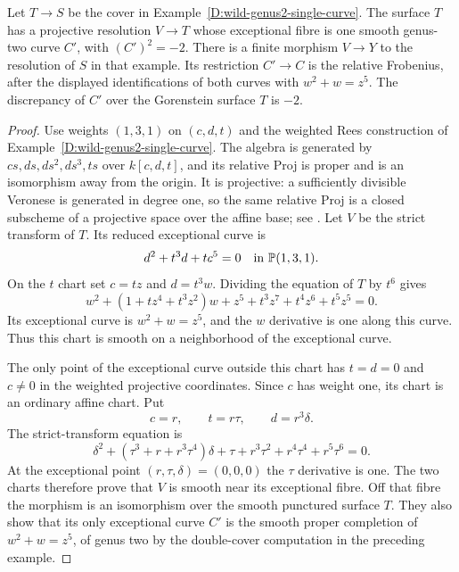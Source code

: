 \begin{proposition}
\label{D:wild-genus2-source}
Let $T\to S$ be the cover in Example~\ref{D:wild-genus2-single-curve}.
The surface $T$ has a projective resolution $V\to T$ whose
exceptional fibre is one smooth genus-two curve $C'$, with
$(C')^2=-2$.  There is a finite morphism $V\to Y$ to the
resolution of $S$ in that example.  Its restriction $C'\to C$
is the relative Frobenius, after the displayed identifications
of both curves with $w^2+w=z^5$.  The discrepancy of $C'$
over the Gorenstein surface $T$ is $-2$.
\end{proposition}
\begin{proof}
Use weights $(1,3,1)$ on $(c,d,t)$ and the weighted Rees
construction of Example~\ref{D:wild-genus2-single-curve}.
The algebra is generated by $cs,ds,ds^2,ds^3,ts$ over
$k[c,d,t]$, and its relative Proj is proper and is an
isomorphism away from the origin.  It is projective: a
sufficiently divisible Veronese is generated in degree one,
so the same relative Proj is a closed subscheme of a
projective space over the affine base; see
\cite[Lemma 10.56.2, tag 0EGH]{StacksBWildSource}.
Let $V$ be the strict
transform of $T$.  Its reduced exceptional curve is
\[
                 d^2+t^3d+tc^5=0
                       \quad\hbox{in }\mathbb P(1,3,1).
\]
On the $t$ chart set $c=tz$ and $d=t^3w$.  Dividing the
equation of $T$ by $t^6$ gives
\begin{equation}\label{D:source-t-chart}
 w^2+(1+tz^4+t^3z^2)w+
            z^5+t^3z^7+t^4z^6+t^5z^5=0.
\end{equation}
Its exceptional curve is $w^2+w=z^5$, and the $w$
derivative is one along this curve.  Thus this chart is
smooth on a neighborhood of the exceptional curve.

The only point of the exceptional curve outside this chart
has $t=d=0$ and $c\ne0$ in the weighted projective coordinates.
Since $c$ has weight one, its chart is an ordinary affine
chart.  Put
\[
                   c=r,\qquad t=r\tau,\qquad d=r^3\delta.
\]
The strict-transform equation is
\begin{equation}\label{D:source-c-chart}
 \delta^2+(\tau^3+r+r^3\tau^4)\delta
       +\tau+r^3\tau^2+r^4\tau^4+r^5\tau^6=0.
\end{equation}
At the exceptional point $(r,\tau,\delta)=(0,0,0)$ the
$\tau$ derivative is one.  The two charts therefore prove
that $V$ is smooth near its exceptional fibre.  Off that
fibre the morphism is an isomorphism over the smooth
punctured surface $T$.  They also show that its only
exceptional curve $C'$ is the smooth proper completion of
$w^2+w=z^5$, of genus two by the double-cover computation
in the preceding example.


\end{proof}
